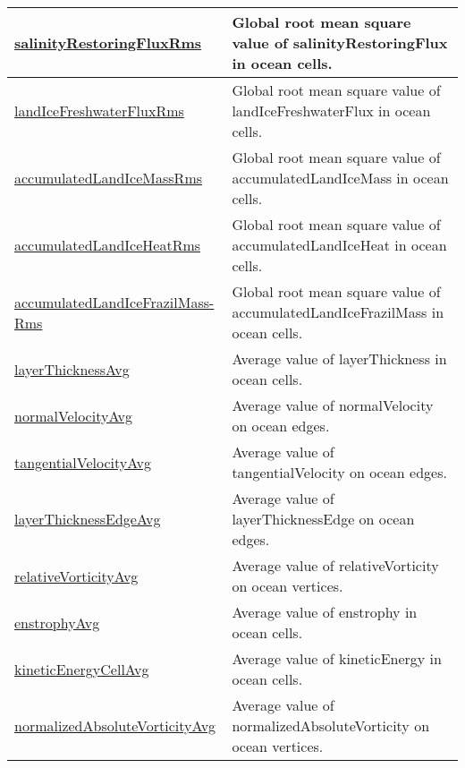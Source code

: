 {\begin{center}
\begin{longtable}{| p{2.0in} | p{4.0in} |}
    \hline
    \hyperref[subsec:var_sec_globalStatsAM_salinityRestoringFluxRms]{salinityRestoringFluxRms} & Global root mean square value of salinityRestoringFlux in ocean cells. \\
    \hline
    \hyperref[subsec:var_sec_globalStatsAM_landIceFreshwaterFluxRms]{landIceFreshwaterFluxRms} & Global root mean square value of landIceFreshwaterFlux in ocean cells. \\
    \hline
    \hyperref[subsec:var_sec_globalStatsAM_accumulatedLandIceMassRms]{accumulatedLandIceMassRms} & Global root mean square value of accumulatedLandIceMass in ocean cells. \\
    \hline
    \hyperref[subsec:var_sec_globalStatsAM_accumulatedLandIceHeatRms]{accumulatedLandIceHeatRms} & Global root mean square value of accumulatedLandIceHeat in ocean cells. \\
    \hline
    \hyperref[subsec:var_sec_globalStatsAM_accumulatedLandIceFrazilMassRms]{accumulatedLandIceFrazilMass-}\hyperref[subsec:var_sec_globalStatsAM_accumulatedLandIceFrazilMassRms]{Rms}  & Global root mean square value of accumulatedLandIceFrazilMass in ocean cells. \\
    \hline
    \hyperref[subsec:var_sec_globalStatsAM_layerThicknessAvg]{layerThicknessAvg} & Average value of layerThickness in ocean cells. \\
    \hline
    \hyperref[subsec:var_sec_globalStatsAM_normalVelocityAvg]{normalVelocityAvg} & Average value of normalVelocity on ocean edges. \\
    \hline
    \hyperref[subsec:var_sec_globalStatsAM_tangentialVelocityAvg]{tangentialVelocityAvg} & Average value of tangentialVelocity on ocean edges. \\
    \hline
    \hyperref[subsec:var_sec_globalStatsAM_layerThicknessEdgeAvg]{layerThicknessEdgeAvg} & Average value of layerThicknessEdge on ocean edges. \\
    \hline
    \hyperref[subsec:var_sec_globalStatsAM_relativeVorticityAvg]{relativeVorticityAvg} & Average value of relativeVorticity on ocean vertices. \\
    \hline
    \hyperref[subsec:var_sec_globalStatsAM_enstrophyAvg]{enstrophyAvg} & Average value of enstrophy in ocean cells. \\
    \hline
    \hyperref[subsec:var_sec_globalStatsAM_kineticEnergyCellAvg]{kineticEnergyCellAvg} & Average value of kineticEnergy in ocean cells. \\
    \hline
    \hyperref[subsec:var_sec_globalStatsAM_normalizedAbsoluteVorticityAvg]{normalizedAbsoluteVorticityAvg} & Average value of normalizedAbsoluteVorticity on ocean vertices. \\

\end{longtable}
\end{center}}
